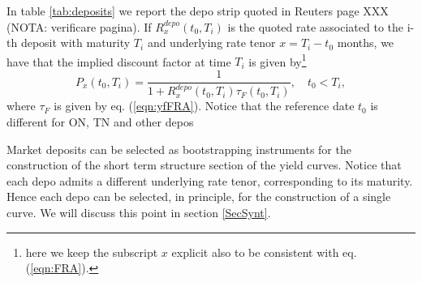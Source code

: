 \documentclass[11pt,reqno]{amsart}
\begin{document}
\par
In table \ref{tab:deposits} we report the depo strip quoted in Reuters page XXX (NOTA: verificare pagina).
If $R^{depo}_x\left(t_0,T_i\right)$ is the quoted rate associated to the i-th deposit with maturity $T_i$ and underlying rate tenor $x=T_i - t_0$ months, we have that the implied discount factor at time $T_i$ is given by\footnote{here we keep the subscript $x$ explicit also to be consistent with eq. (\ref{eqn:FRA}).}
\begin{equation}
P_x(t_0,T_i) = \frac{1}{1 + R^{depo}_x\left(t_0,T_i\right)\tau_F\left(t_0,T_i\right)},\quad t_0<T_i,
\label{eqn:deposit}
\end{equation}
where $\tau_F$ is given by eq. (\ref{eqn:yfFRA}). Notice that the reference date $t_0$ is different for ON, TN and other depos
\par
Market deposits can be selected as bootstrapping instruments for the construction of the short term structure section of the yield curves. Notice that each depo admits a different underlying rate tenor, corresponding to its maturity. Hence each depo can be selected, in principle, for the construction of a single curve. We will discuss this point in section \ref{SecSynt}.
\end{document}
